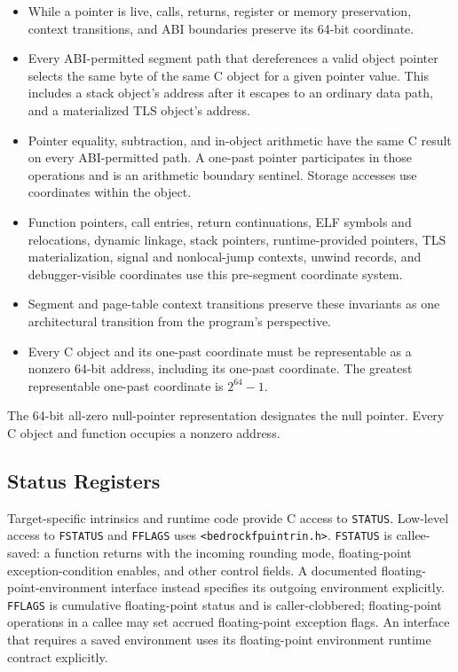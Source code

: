 \documentclass[10pt,twoside]{article}
\begin{document}
\begin{itemize}
\item While a pointer is live, calls, returns, register or memory preservation,
context transitions, and ABI boundaries preserve its 64-bit coordinate.
\item Every ABI-permitted segment path that dereferences a valid object
pointer selects the same byte of the same C object for a given pointer value.
This includes a stack object's address after it escapes to an ordinary data
path, and a materialized TLS object's address.
\item Pointer equality, subtraction, and in-object arithmetic have the same C
result on every ABI-permitted path. A one-past pointer participates in those
operations and is an arithmetic boundary sentinel. Storage accesses use
coordinates within the object.
\item Function pointers, call entries, return continuations, ELF symbols and
relocations, dynamic linkage, stack pointers, runtime-provided pointers, TLS
materialization, signal and nonlocal-jump contexts, unwind records, and
debugger-visible coordinates use this pre-segment coordinate system.
\item Segment and page-table context transitions preserve these invariants as
one architectural transition from the program's perspective.
\item Every C object and its one-past coordinate must be representable as a
nonzero 64-bit address, including its one-past coordinate. The greatest
representable one-past coordinate is $2^{64}-1$.
\end{itemize}

The 64-bit all-zero null-pointer representation designates the null pointer.
Every C object and function occupies a nonzero address.

\subsection{Status Registers}
Target-specific intrinsics and runtime code provide C access to
\texttt{STATUS}. Low-level access to
\texttt{FSTATUS} and \texttt{FFLAGS} uses
\texttt{<bedrockfpuintrin.h>}. \texttt{FSTATUS} is callee-saved: a function
returns with the incoming rounding mode, floating-point exception-condition enables, and other control fields.
A documented floating-point-environment interface instead specifies its
outgoing environment explicitly.
\texttt{FFLAGS} is cumulative floating-point status and is caller-clobbered;
floating-point operations in a callee may set accrued floating-point exception flags. An
interface that requires a saved environment uses its floating-point environment
runtime contract explicitly.
\end{document}
